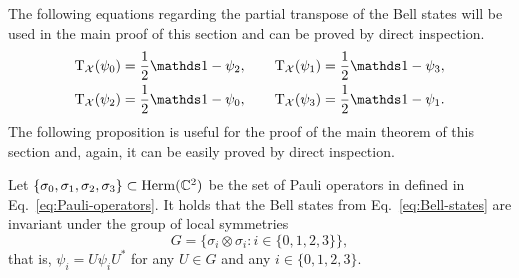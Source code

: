 The following equations regarding the partial transpose of the Bell states will 
be used in the main proof of this section and can be proved by direct inspection.
\begin{equation}
  \label{eq:ppt-bell-states}
  \begin{aligned}
    \pt_{\X}(\psi_{0}) = \frac{1}{2}\I - \psi_{2},\qquad
    \pt_{\X}(\psi_{1}) = \frac{1}{2}\I - \psi_{3},\\
    \pt_{\X}(\psi_{2}) = \frac{1}{2}\I - \psi_{0},\qquad
    \pt_{\X}(\psi_{3}) = \frac{1}{2}\I - \psi_{1}.
  \end{aligned}
\end{equation}
The following proposition is useful for the proof of the main theorem of this 
section and, again, it can be easily proved by direct inspection.
\begin{prop}
\label{prop:groupG}
Let $\{\sigma_{0}, \sigma_{1}, \sigma_{2}, \sigma_{3}\} \subset \mathrm{Herm}(\mathbb{C}^{2})$ 
be the set of Pauli operators in defined in Eq.~\eqref{eq:Pauli-operators}.
It holds that the Bell states from Eq.~\eqref{eq:Bell-states} are invariant under the group of local symmetries
\begin{equation}
  G = \big\{ \sigma_{i} \otimes \sigma_{i} : i\in\{0,1,2,3\}  \big\},
\end{equation}
that is, $\psi_{i} = U\psi_{i}U^{*}$ for any $U \in G$ and any $i\in\{0,1,2,3\}$.
\end{prop}


